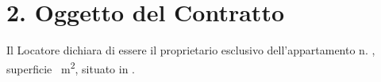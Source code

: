 \section*{2. Oggetto del Contratto}
Il Locatore dichiara di essere il proprietario esclusivo dell'appartamento n. \Propunitnumber, superficie \Propaream~m\textsuperscript{2}, situato in \Propaddress.
